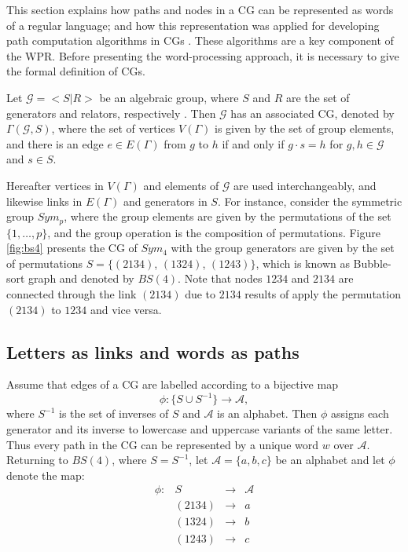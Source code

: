 \label{sec:2-WPapproach}

This section explains how paths and nodes in a CG can be represented as words of a regular language; and how this representation was applied for developing path computation algorithms in CGs \cite{AGUIRREGUERRERO2019218}. These algorithms are a key component of the WPR.
Before presenting the word-processing approach, it is necessary to give the formal definition of CGs. 

Let $\mathcal{G}=<S|R>$ be an algebraic group, where $S$ and $R$ are the set of generators and relators, respectively \cite[Section 2.2]{group_theory}. Then $\mathcal{G}$ has an associated CG, denoted by $\Gamma(\mathcal{G},S)$, where the set of vertices $V(\Gamma)$ is given by the set of group elements, and there is an edge $e\in E(\Gamma)$ from $g$ to $h$ if and only if  $g\cdot s = h$ for $g,h\in \mathcal{G}$ and $s\in S$. 



Hereafter vertices in $V(\Gamma)$ and elements of $\mathcal{G}$ are used interchangeably, and likewise links in $E(\Gamma)$ and generators in $S$. For instance, consider the symmetric group $Sym                      _p$,  where the group elements are given by the permutations of the set $\{1,\ldots,p\}$, and the group operation is the composition of permutations. Figure \ref{fig:bs4} presents the CG of $Sym_4$ with the group generators are given by the set of permutations $S=\{(2134)$, $(1324)$, $(1243)\}$, which is known as Bubble-sort graph and denoted by $BS(4)$. Note that nodes $1234$ and $2134$ are connected through the link $(2134)$ due to $2134$ results of apply the permutation $(2134)$ to $1234$ and vice versa.

\subsection{Letters as links and words as paths}
\label{sec:words_as_paths}

Assume that edges of a CG are labelled according to a bijective map
\begin{equation}
\label{eq:bijective_map}
  \phi: \{S \cup S^{-1}\}\to \mathcal{A},
\end{equation}
where $S^{-1}$ is the set of inverses of $S$ and $\mathcal{A}$ is an alphabet. Then $\phi$ assigns each generator and its inverse to lowercase and uppercase variants of the same letter. 
Thus every path in the CG can be represented by a unique word $w$ over $\mathcal{A}$. 
Returning to $BS(4)$, where $S=S^{-1}$, let $\mathcal{A}=\{a,b,c\}$ be an alphabet and let $\phi$ denote the map:
\begin{equation}
\label{eq:mapGenAlpBS}
\begin{matrix}
\phi:& S & \to & \mathcal{A} \\
 & (2134) & \to & a \\ 
 & (1324) & \to & b \\ 
 & (1243) & \to & c 
\end{matrix}
\end{equation}

